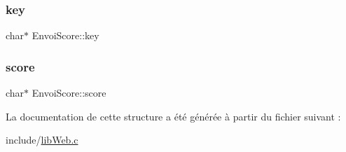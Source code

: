 \subsubsection{\texorpdfstring{key}{key}}
{\footnotesize\ttfamily char$\ast$ Envoi\+Score\+::key}

\mbox{\label{struct_envoi_score_a9916e25187448f3c8b8a6c2b5fd05128}} 
\subsubsection{\texorpdfstring{score}{score}}
{\footnotesize\ttfamily char$\ast$ Envoi\+Score\+::score}



La documentation de cette structure a été générée à partir du fichier suivant \+:\begin{DoxyCompactItemize}
\item 
include/\hyperlink{lib_web_8c}{lib\+Web.\+c}\end{DoxyCompactItemize}
